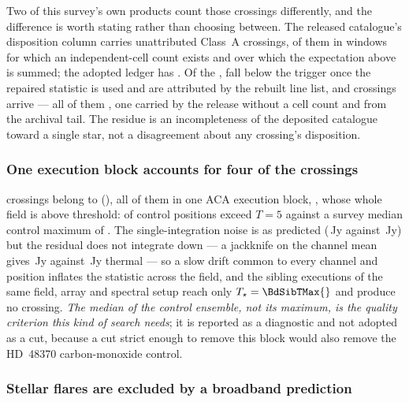 Two of this survey's own products count those crossings differently, and the
difference is worth stating rather than choosing between. The released
catalogue's disposition column carries \CnRelUnattrA{} unattributed Class~A
crossings, \CnRelCovA{} of them in windows for which an independent-cell count
exists and over which the expectation above is summed; the adopted ledger has
\ChnUnattrA. Of the \CnRelCovA, \CnNFell{} fall below the trigger once the
repaired statistic is used and \CnNMaskAttr{} are attributed by the rebuilt
line list, and \CnArrivedWord{} crossings arrive --- all of them
\CnArrivedStarTex, one carried by the release without a cell count and
\CnNArrivedTail{} from the archival tail. The residue is an incompleteness of
the deposited catalogue toward a single star, not a disagreement about any
crossing's disposition.

\subsubsection{One execution block accounts for four of the crossings}
\label{sec:bdblock}

\BdNCross{} crossings belong to \BdStar{} (\BdAlias), all \BdNCrossBlock{} of
them in one ACA execution block, \texttt{\BdBlock}, whose whole field is above
threshold: \BdNCtrlAbove{} of \BdNCtrl{} control positions exceed $T=5$
against a survey median control maximum of \BdSurvCtrlMed. The
single-integration noise is as predicted (\BdRmsMeas\,Jy against
\BdRmsPred\,Jy) but the residual does not integrate down --- a jackknife on
the channel mean gives \BdJack\,Jy against \BdThermal\,Jy thermal --- so a
slow drift common to every channel and position inflates the statistic across
the field, and the \BdNSibling{} sibling executions of the same field, array
and spectral setup reach only $T_\star=\BdSibTMax{}$ and produce no crossing.
\emph{The median of the control ensemble, not its maximum, is the quality
criterion this kind of search needs}; it is reported as a diagnostic and not
adopted as a cut, because a cut strict enough to remove this block would also
remove the HD~48370 carbon-monoxide control.

\subsubsection{Stellar flares are excluded by a broadband prediction}

